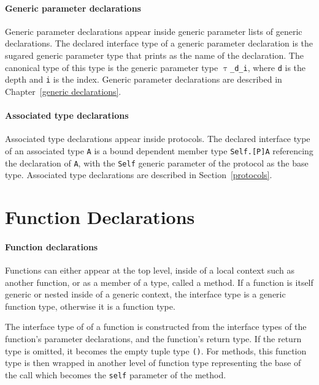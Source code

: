 \documentclass[a4paper,headsepline,bibliography=totoc,toc=flat,fleqn,twoside=semi]{scrbook}
\theoremstyle{definition}
\theoremstyle{definition}
\theoremstyle{definition}
\newcommand{\ttgp}[2]{\texttt{$\uptau$\_#1\_#2}}
\begin{document}
\paragraph{Generic parameter declarations}
Generic parameter declarations appear inside generic parameter lists of generic declarations. The declared interface type of a generic parameter declaration is the sugared generic parameter type that prints as the name of the declaration. The canonical type of this type is the generic parameter type \ttgp{d}{i}, where \texttt{d} is the depth and \texttt{i} is the index. Generic parameter declarations are described in Chapter~\ref{generic declarations}.

\paragraph{Associated type declarations}
Associated type declarations appear inside protocols. The declared interface type of an associated type \texttt{A} is a bound dependent member type \texttt{Self.[P]A} referencing the declaration of \texttt{A}, with the \texttt{Self} generic parameter of the protocol as the base type. Associated type declarations are described in Section~\ref{protocols}.

\section{Function Declarations}\label{func decls}

\paragraph{Function declarations}
Functions can either appear at the top level, inside of a local context such as another function, or as a member of a type, called a method. If a function is itself generic or nested inside of a generic context, the interface type is a generic function type, otherwise it is a function type.

The interface type of of a function is constructed from the interface types of the function's parameter declarations, and the function's return type. If the return type is omitted, it becomes the empty tuple type \texttt{()}. For methods, this function type is then wrapped in another level of function type representing the base of the call which becomes the \texttt{self} parameter of the method.
\end{document}
